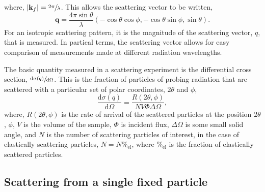 %
where, $|\mathbf{k}_f| = \sfrac{2\pi}{\lambda}$. This allows the scattering vector to be written,
%
\begin{equation}
	\mathbf{q} = \frac{4\pi\sin{\theta}}{\lambda}(-\cos{\theta}\cos{\phi}, -\cos{\theta}\sin{\phi},\sin{\theta}).
\end{equation}
%
For an isotropic scattering pattern, it is the magnitude of the scattering vector, $q$, that is measured.
In partical terms, the scattering vector allows for easy comparison of measurements made at different radiation wavelengths.

The basic quantity measured in a scattering experiment is the differential cross section, $\sfrac{\text{d}\sigma(q)}{\text{d}\Omega}$.
This is the fraction of particles of probing radiation that are scattered with a particular set of polar coordinates, $2\theta$ and $\phi$,
%
\begin{equation}
	\frac{\text{d}\sigma(q)}{\text{d}\Omega} = \frac{R(2\theta,\phi)}{NV\Phi\Delta \Omega},
	\label{equ:dsc}
\end{equation}
%
where, $R(2\theta,\phi)$ is the rate of arrival of the scattered particles at the position $2\theta$, $\phi$, $V$ is the volume of the sample, $\Phi$ is incident flux, $\Delta \Omega$ is some small solid angle, and $N$ is the number of scattering particles of interest, in the case of elastically scattering particles, $N = N\%_{\text{el}}$, where $\%_{\text{el}}$ is the fraction of elastically scattered particles.

\subsection{Scattering from a single fixed particle}

